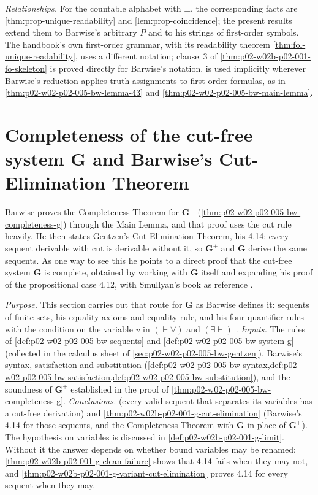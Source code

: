 \emph{Relationships.}  For the countable alphabet with \(\bot\), the
corresponding facts are \cref{thm:prop-unique-readability} and
\cref{lem:prop-coincidence}; the present results extend them to Barwise's
arbitrary \(P\) and to his strings of first-order symbols.  The handbook's
own first-order grammar, with its readability theorem
\cref{thm:fol-unique-readability}, uses a different notation; clause~3 of
\cref{thm:p02-w02b-p02-001-fo-skeleton} is proved directly for Barwise's
notation.   is used implicitly
wherever Barwise's reduction applies truth assignments to first-order
formulas, as in \cref{thm:p02-w02-p02-005-bw-lemma-43} and
\cref{thm:p02-w02-p02-005-bw-main-lemma}.

\section{Completeness of the cut-free system G and Barwise's Cut-Elimination Theorem}
\label{sec:p02-w02b-p02-001-g-completeness}

Barwise proves the Completeness Theorem for \(\mathbf G^{+}\)
(\cref{thm:p02-w02-p02-005-bw-completeness-g}) through the Main Lemma, and
that proof uses the cut rule heavily.  He then states Gentzen's
Cut-Elimination Theorem, his 4.14: every sequent derivable with cut is
derivable without it, so \(\mathbf G^{+}\) and \(\mathbf G\) derive the same
sequents.  As one way to see this he points to a direct proof that the
cut-free system \(\mathbf G\) is complete, obtained by working with
\(\mathbf G\) itself and expanding his proof of the propositional case 4.12,
with Smullyan's book as reference \cite[ch.~A.1, \S4, p.~40]{Barwise1977FirstOrder}.

\emph{Purpose.}  This section carries out that route for \(\mathbf G\) as
Barwise defines it: sequents of finite sets, his equality axioms and
equality rule, and his four quantifier rules with the condition on the
variable \(v\) in \((\vdash\forall)\) and \((\exists\vdash)\)
\cite[ch.~A.1, \S4, pp.~37, 39]{Barwise1977FirstOrder}.
\emph{Inputs.}  The rules of \cref{def:p02-w02-p02-005-bw-sequents} and
\cref{def:p02-w02-p02-005-bw-system-g} (collected in the calculus sheet of
\cref{sec:p02-w02-p02-005-bw-gentzen}), Barwise's syntax, satisfaction and
substitution
(\cref{def:p02-w02-p02-005-bw-syntax,def:p02-w02-p02-005-bw-satisfaction,def:p02-w02-p02-005-bw-substitution}),
and the soundness of \(\mathbf G^{+}\) established in the proof of
\cref{thm:p02-w02-p02-005-bw-completeness-g}.
\emph{Conclusions.}   (every valid
sequent that separates its variables has a cut-free derivation) and
\cref{thm:p02-w02b-p02-001-g-cut-elimination} (Barwise's 4.14 for those
sequents, and the Completeness Theorem with \(\mathbf G\) in place of
\(\mathbf G^{+}\)).  The hypothesis on variables is discussed in
\cref{def:p02-w02b-p02-001-g-limit}.  Without it the answer depends on
whether bound variables may be renamed:
\cref{thm:p02-w02b-p02-001-g-clean-failure} shows that 4.14 fails when they
may not, and \cref{thm:p02-w02b-p02-001-g-variant-cut-elimination} proves
4.14 for every sequent when they may.

